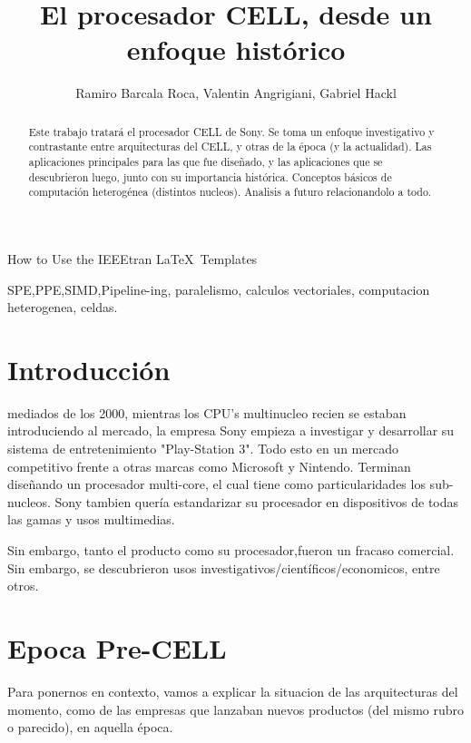 \documentclass[10pt,compsoc]{IEEEtran}
\begin{document}
	\title{El procesador CELL, desde un enfoque
		histórico}
	\author{Ramiro Barcala Roca, Valentin Angrigiani, Gabriel Hackl}
		
	{How to Use the IEEEtran \LaTeX \ Templates}
	\maketitle
	
	\begin{abstract}
		Este trabajo tratará el procesador CELL de Sony. Se toma un enfoque investigativo y contrastante entre arquitecturas del CELL, y otras de la época (y la actualidad). Las aplicaciones principales para las que fue diseñado, y las aplicaciones que se descubrieron luego, junto  con su importancia histórica. Conceptos básicos de computación heterogénea (distintos nucleos). Analisis a futuro relacionandolo a todo.
	\end{abstract}
	
	\begin{IEEEkeywords}
		SPE,PPE,SIMD,Pipeline-ing, paralelismo, calculos vectoriales, computacion heterogenea, celdas.
	\end{IEEEkeywords}
	
	\section{Introducción}
	 mediados de los 2000, mientras los CPU's multinucleo recien se estaban introduciendo al mercado, la empresa Sony empieza a investigar y desarrollar su sistema de entretenimiento "Play-Station 3". Todo esto en un mercado competitivo frente a otras marcas como Microsoft y Nintendo. Terminan diseñando un procesador multi-core, el cual tiene como particularidades los sub-nucleos. Sony tambien quería estandarizar su procesador en dispositivos de todas las gamas y usos multimedias.
	
	Sin embargo, tanto el producto como su procesador,fueron un fracaso comercial. Sin embargo, se descubrieron usos investigativos/científicos/economicos, entre otros.
	
	
	\section{Epoca Pre-CELL}
	\noindent Para ponernos en contexto, vamos a explicar la situacion de las arquitecturas del momento, como de las empresas que lanzaban nuevos productos (del mismo rubro o parecido), en aquella época.
	
\end{document}
